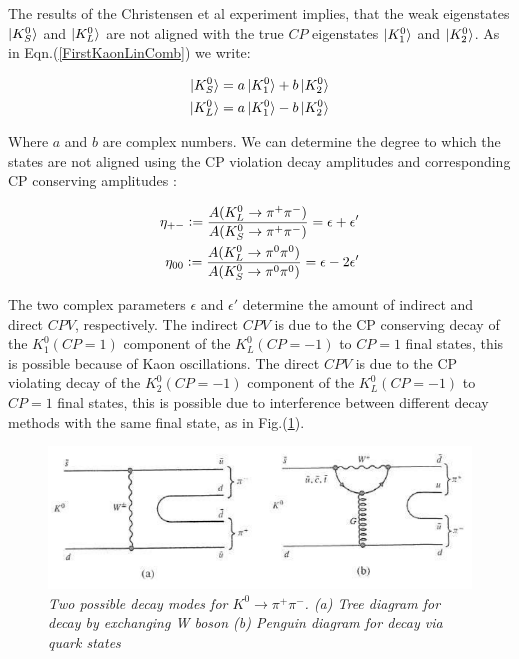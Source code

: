 The results of the Christensen et al experiment implies, that the weak eigenstates $\ket{K^{0}_{S}}$ and $\ket{K^{0}_{L}}$ are not aligned with the true $CP$ eigenstates $\ket{K^{0}_{1}}$ and $\ket{K^{0}_{2}}$. As in Eqn.(\ref{FirstKaonLinComb})  we write:

\begin{align}
\label{KaonLincomb11}
\ket{K^{0}_{S}} = a \ket{K^{0}_{1}} + b \ket{K^{0}_{2}} \\
\label{KaonLincomb12}
\ket{K^{0}_{L}} = a \ket{K^{0}_{1}} - b \ket{K^{0}_{2}}
\end{align}

\noindent Where $a$ and $b$ are complex numbers. We can determine the degree to which the states are not aligned using the CP violation decay amplitudes and corresponding CP conserving amplitudes \cite{Measurements_Direct_CPV_Kaons_KTev}: 

\begin{align*}
\eta_{+-} \vcentcolon= \frac{A(K^{0}_L \rightarrow \pi^+ \pi^-)}{A(K^{0}_S \rightarrow \pi^+ \pi^-)} = \epsilon + \epsilon' \\ 
\eta_{00} \vcentcolon= \frac{A(K^{0}_L \rightarrow \pi^0 \pi^0)}{A(K^{0}_S \rightarrow \pi^0 \pi^0)} = \epsilon - 2\epsilon' 
\end{align*}

\noindent The two complex parameters $\epsilon$ and $\epsilon'$ determine the amount of indirect and direct $CPV$, respectively. The indirect $CPV$ is due to the CP conserving decay of the $K^{0}_{1}(CP =1)$ component of the $K^{0}_{L}(CP=-1)$ to $CP=1$ final states, this is possible because of Kaon oscillations. The direct $CPV$ is due to the CP violating decay of the $K^{0}_{2}(CP =-1)$ component of the $K^{0}_{L}(CP=-1)$ to $CP=1$ final states, this is possible due to interference between different decay methods with the same final state, as in Fig.(\ref{HEPP_intro_Perkins}).  

\begin{figure}[h!]
\begin{center}
\includegraphics[scale=0.3]{figs/Perkins_Interference_Kaons.png}
\end{center}
\caption{\textit{Two possible decay modes for $K^{0} \rightarrow \pi^+ \pi^-$. (a) Tree diagram for decay by exchanging W boson (b) Penguin diagram for decay via quark states \cite{HEPP_intro_Perkins}}}
\label{HEPP_intro_Perkins}
\end{figure}

